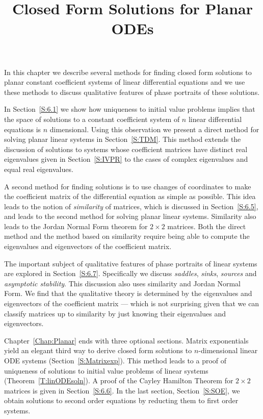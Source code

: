 \documentclass{ximera}
\title{Closed Form Solutions for Planar ODEs}
\begin{document}
\begin{abstract}
\end{abstract}
\maketitle


\label{Chap:Planar}

\normalsize

In this chapter we describe several methods for finding closed form
solutions to planar constant coefficient systems of linear differential
equations and we use these methods to discuss qualitative features 
of phase portraits of these solutions.

In Section~\ref{S:6.1} we show how uniqueness to
initial value problems implies that the space of solutions to a constant
coefficient system of $n$ linear differential equations is $n$ dimensional.
Using this observation we present a direct method for solving planar linear
systems in Section~\ref{S:TDM}.  This method extends the discussion of
solutions to systems whose coefficient matrices have distinct real
eigenvalues given in Section~\ref{S:IVPR} to the cases of complex
eigenvalues and equal real eigenvalues.

A second method for finding solutions is to use changes of coordinates to 
make the coefficient matrix of the differential equation as simple as possible.  
This idea leads to the notion of {\em similarity\/} of matrices, which is discussed 
in Section~\ref{S:6.5}, and leads to the second method for solving planar linear 
systems. Similarity also leads to the Jordan Normal Form theorem for 
$2\times 2$ matrices.
Both the direct method and the method based on similarity require 
being able to compute the eigenvalues and eigenvectors of the coefficient matrix.

The important subject of qualitative features of phase portraits of linear systems are explored in
Section~\ref{S:6.7}.  Specifically we discuss {\em saddles\/}, {\em sinks\/}, 
{\em sources\/} and {\em asymptotic stability}.  This discussion also uses similarity 
and Jordan Normal Form.  We find that the qualitative theory is determined 
by the eigenvalues and eigenvectors of the coefficient matrix --- which is not 
surprising given that we can classify matrices up to similarity by just knowing 
their eigenvalues and eigenvectors.  

Chapter~\ref{Chap:Planar} ends with three optional sections.  Matrix exponentials 
yield an elegant third way to derive closed form solutions to $n$-dimensional linear 
ODE systems (Section~\ref{S:Matrixexp}).  This method 
leads to a proof of uniqueness of solutions to initial value problems of linear systems 
(Theorem~\ref{T:linODEsoln}).  A proof of the Cayley Hamilton Theorem 
for $2\times 2$ matrices is given in Section~\ref{S:6.6}.
In the last section, Section~\ref{S:SOE}, we obtain solutions to second order 
equations by reducting them to first order systems.
\end{document}
